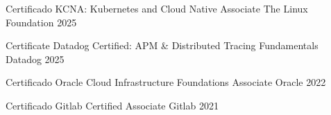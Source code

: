 

\begin{cvhonors}

\cvhonor
  {Certificado} %
  {KCNA: Kubernetes and Cloud Native Associate} %
  {The Linux Foundation} %
  {2025} %


\cvhonor
  {Certificate} %
  {Datadog Certified: APM & Distributed Tracing Fundamentals} %
  {Datadog} %
  {2025} %

  
\cvhonor
  {Certificado} %
  {Oracle Cloud Infrastructure Foundations Associate} %
  {Oracle} %
  {2022} %


  \cvhonor
    {Certificado} %
    {Gitlab Certified Associate} %
    {Gitlab} %
    {2021} %

\end{cvhonors}

